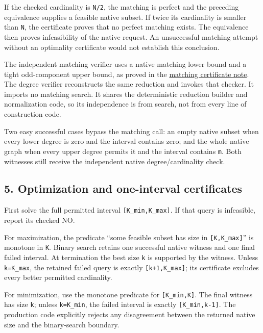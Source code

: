 If the checked cardinality is \texttt{N/2}, the matching is perfect and the preceding equivalence supplies a feasible native subset. If twice its cardinality is smaller than \texttt{N}, the certificate proves that no perfect matching exists. The equivalence then proves infeasibility of the native request. An unsuccessful matching attempt without an optimality certificate would not establish this conclusion.

The independent matching verifier uses a native matching lower bound and a tight odd-component upper bound, as proved in the \href{https://github.com/icekylinx/algorithm-frontier/blob/main/problems/general-matching/reference/certificate-proof.md}{matching certificate note}. The degree verifier reconstructs the same reduction and invokes that checker. It imports no matching search. It shares the deterministic reduction builder and normalization code, so its independence is from search, not from every line of construction code.

Two easy successful cases bypass the matching call: an empty native subset when every lower degree is zero and the interval contains zero; and the whole native graph when every upper degree permits it and the interval contains \texttt{m}. Both witnesses still receive the independent native degree/cardinality check.

\hypertarget{af-5f2ce72611-optimization-and-one-interval-certificates}{%
\subsection{5. Optimization and one-interval certificates}\label{af-5f2ce72611-optimization-and-one-interval-certificates}}

First solve the full permitted interval \texttt{{[}K\_min,K\_max{]}}. If that query is infeasible, report its checked NO.

For maximization, the predicate ``some feasible subset has size in \texttt{{[}K,K\_max{]}}'' is monotone in \texttt{K}. Binary search retains one successful native witness and one final failed interval. At termination the best size \texttt{k} is supported by the witness. Unless \texttt{k=K\_max}, the retained failed query is exactly \texttt{{[}k+1,K\_max{]}}; its certificate excludes every better permitted cardinality.

For minimization, use the monotone predicate for \texttt{{[}K\_min,K{]}}. The final witness has size \texttt{k}; unless \texttt{k=K\_min}, the failed interval is exactly \texttt{{[}K\_min,k-1{]}}. The production code explicitly rejects any disagreement between the returned native size and the binary-search boundary.

